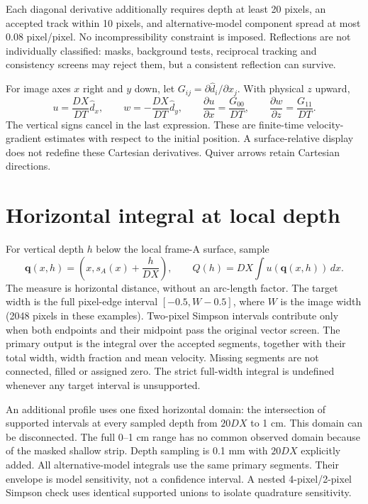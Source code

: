 \documentclass[11pt]{article}
\begin{document}
Each diagonal derivative additionally requires depth at least 20 pixels, an accepted track within 10 pixels, and alternative-model component spread at most $0.08$ pixel/pixel. No incompressibility constraint is imposed. Reflections are not individually classified: masks, background tests, reciprocal tracking and consistency screens may reject them, but a consistent reflection can survive.

For image axes $x$ right and $y$ down, let $G_{ij}=\partial\widehat d_i/\partial x_j$. With physical $z$ upward,
\[
 u=\frac{DX}{DT}\widehat d_x,\qquad
 w=-\frac{DX}{DT}\widehat d_y,\qquad
 \frac{\partial u}{\partial x}=\frac{G_{00}}{DT},\qquad
 \frac{\partial w}{\partial z}=\frac{G_{11}}{DT}.
\]
The vertical signs cancel in the last expression. These are finite-time velocity-gradient estimates with respect to the initial position. A surface-relative display does not redefine these Cartesian derivatives. Quiver arrows retain Cartesian directions.

\section{Horizontal integral at local depth}
For vertical depth $h$ below the local frame-A surface, sample
\[
 \mathbf q(x,h)=\left(x,s_A(x)+\frac h{DX}\right),\qquad
 Q(h)=DX\int u(\mathbf q(x,h))\,dx.
\]
The measure is horizontal distance, without an arc-length factor. The target width is the full pixel-edge interval $[-0.5,W-0.5]$, where $W$ is the image width (2048 pixels in these examples). Two-pixel Simpson intervals contribute only when both endpoints and their midpoint pass the original vector screen. The primary output is the integral over the accepted segments, together with their total width, width fraction and mean velocity. Missing segments are not connected, filled or assigned zero. The strict full-width integral is undefined whenever any target interval is unsupported.

An additional profile uses one fixed horizontal domain: the intersection of supported intervals at every sampled depth from $20DX$ to 1 cm. This domain can be disconnected. The full 0--1 cm range has no common observed domain because of the masked shallow strip. Depth sampling is 0.1 mm with $20DX$ explicitly added. All alternative-model integrals use the same primary segments. Their envelope is model sensitivity, not a confidence interval. A nested 4-pixel/2-pixel Simpson check uses identical supported unions to isolate quadrature sensitivity.
\end{document}
